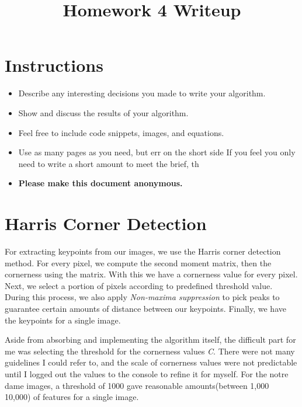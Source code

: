 \date{}

\title{\vspace{-1cm}Homework 4 Writeup}



\maketitle
\vspace{-3cm}
\thispagestyle{fancy}

\section*{Instructions}
\begin{itemize}
  \item Describe any interesting decisions you made to write your algorithm.
  \item Show and discuss the results of your algorithm.
  \item Feel free to include code snippets, images, and equations.
  \item Use as many pages as you need, but err on the short side If you feel you only need to write a short amount to meet the brief, th

  \item \textbf{Please make this document anonymous.}
\end{itemize}

\section*{Harris Corner Detection}
For extracting keypoints from our images, we use the Harris corner detection method. For every pixel, we compute the second moment matrix, then the cornerness using the matrix. With this we have a cornerness value for every pixel. Next, we select a portion of pixels according to predefined threshold value. During this process, we also apply \emph{Non-maxima suppression} to pick peaks to guarantee certain amounts of distance between our keypoints. Finally, we have the keypoints for a single image.

Aside from absorbing and implementing the algorithm itself, the difficult part for me was selecting the threshold for the cornerness values \emph{C}. There were not many guidelines I could refer to, and the scale of cornerness values were not predictable until I logged out the values to the console to refine it for myself. For the notre dame images, a threshold of 1000 gave reasonable amounts(between 1,000 ~ 10,000) of features for a single image.

